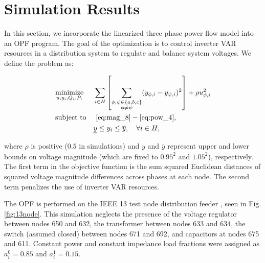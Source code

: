 \section{Simulation Results}

\setlength{\belowdisplayskip}{5pt} \setlength{\belowdisplayshortskip}{5pt}

\setlength{\textfloatsep }{-2.5pt}
\setlength{\floatsep }{-2.5pt}

\setlength{\dbltextfloatsep }{-0pt}
\setlength{\dblfloatsep }{-5pt}

In this section, we incorporate the linearized three phase power flow model into an OPF program.  The goal of the optimization is to control inverter VAR resources in a distribution system to regulate and balance system voltages.  We define the problem as:

\begin{equation}
\begin{aligned}
& \underset{u,y_{i},Q_{i},P_{i}}{\text{minimize}}
& & \sum_{i \in H} \left[ \sum_{ \substack{ {\phi, \psi \in \{ a,b,c\}} \\ {\phi \neq \psi} }} ( y_{\phi,i} - y_{\psi,i} )^{2}\right] + \rho u_{\phi,i}^2   \\
& \text{subject to}
& & ~\eqref{eq:mag_8}-\eqref{eq:pow_4}, \\
& & & \underline{y} \le y_{i} \le \overline{y}, \quad  \forall i \in H, 
\end{aligned} \label{eq:opt}
\end{equation}

\noindent where $\rho$ is positive ($0.5$ in simulations) and $\underline{y}$ and $\overline{y}$ represent upper and lower bounds on voltage magnitude (which are fixed to $0.95^{2}$ and $1.05^{2}$), respectively. The first term in the objective function is the sum squared Euclidean distances of squared voltage magnitude differences across phases at each node. The second term penalizes the use of inverter VAR resources.

The OPF is performed on the IEEE 13 test node distribution feeder \cite{IEEEtestfeeder}, seen in Fig. \ref{fig:13node}.  This simulation neglects the presence of the voltage regulator between nodes 650 and 632, the transformer between nodes 633 and 634, the switch (assumed closed) between nodes 671 and 692, and capacitors at nodes 675 and 611. Constant power and constant impedance load fractions were assigned as $a_{i}^{0} = 0.85$ and $a_{i}^{1} = 0.15$.

